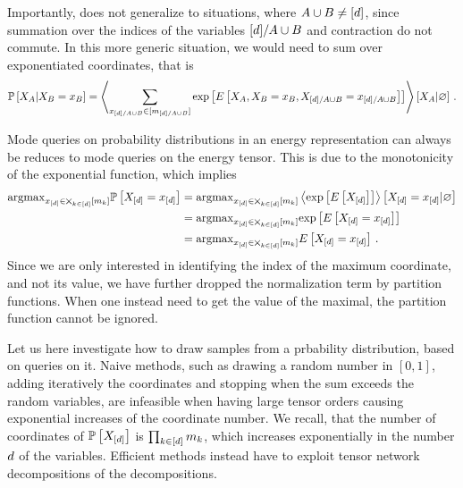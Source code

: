 Importantly,  does not generalize to situations, where $A\cup B\neq[d]$, since summation over the indices of the variables $[d]/A\cup B$ and contraction do not commute.
In this more generic situation, we would need to sum over exponentiated coordinates, that is
\begin{align*}
    \mathbb{P}\left[X_{A}|X_{B}=x_{B}\right]
    = \left\langle 
        \sum_{x_{[d]/A\cup B}\in[m_{[d]/A\cup B}]}
        \mathrm{exp}\left[E\left[X_{A},X_{B}=x_{B},X_{[d]/A\cup B}=x_{[d]/A\cup B}\right]\right]
    \right\rangle \left[ X_{A} | \varnothing \right] \, .
\end{align*}


Mode queries on probability distributions in an energy representation can always be reduces to mode queries on the energy tensor.
This is due to the monotonicity of the exponential function, which implies
\begin{align*}
    \mathrm{argmax}_{x_{[d]}\in\bigtimes_{k\in[d]}[m_{k}]} \mathbb{P}\left[X_{[d]}=x_{[d]}\right]
    &=\mathrm{argmax}_{x_{[d]}\in\bigtimes_{k\in[d]}[m_{k}]} \left\langle \mathrm{exp}\left[E\left[X_{[d]}\right]\right]\right\rangle \left[ X_{[d]}=x_{[d]} | \varnothing \right] \\
    &=\mathrm{argmax}_{x_{[d]}\in\bigtimes_{k\in[d]}[m_{k}]} \mathrm{exp}\left[E\left[X_{[d]}=x_{[d]}\right]\right] \\
    &=\mathrm{argmax}_{x_{[d]}\in\bigtimes_{k\in[d]}[m_{k}]} E\left[X_{[d]}=x_{[d]}\right] \, .
\end{align*}
Since we are only interested in identifying the index of the maximum coordinate, and not its value, we have further dropped the normalization term by partition functions.
When one instead need to get the value of the maximal, the partition function cannot be ignored.


Let us here investigate how to draw samples from a prbability distribution, based on queries on it.
Naive methods, such as drawing a random number in $[0,1]$, adding iteratively the coordinates and stopping when the sum exceeds the random variables, are infeasible when having large tensor orders causing exponential increases of the coordinate number.
We recall, that the number of coordinates of $\mathbb{P}\left[X_{[d]}\right]$ is $\prod_{k\in[d]}m_{k}$, which increases exponentially in the number $d$ of the variables.
Efficient methods instead have to exploit tensor network decompositions of the decompositions.

